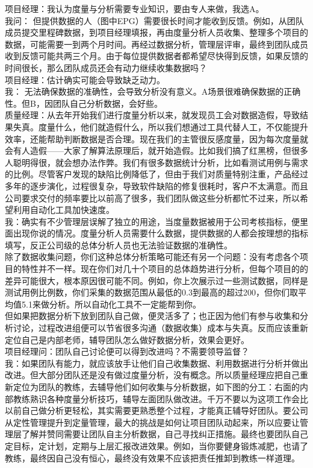 项目经理：我认为度量与分析需要专业知识，要由专人来做，我选A。\\
我问：
但提供数据的人（图中EPG）需要很长时间才能收到反馈。例如，从团队成员提交里程碑数据，到项目经理填报，再由度量分析人员收集、整理多个项目的数据，可能需要一到两个月时间。再经过数据分析，管理层评审，最终到团队成员收到反馈可能共两三个月。由于每位提供数据者都希望尽快得到反馈，如果反馈的时间很长，那么团队成员还会有动力继续收集数据吗？\\
项目经理：估计确实可能会导致缺乏动力。\\
我：
无法确保数据的准确性，会导致分析没有意义。A场景很难确保数据的正确性。但B，因团队自己分析数据，会好些。\\
质量经理：从去年开始我们进行度量分析以来，就发现员工会对数据造假，导致结果失真。度量什么，他们就造假什么，所以我们想通过工具代替人工，不仅能提升效率，还能帮助判断数据是否合理。现在我们的主管很反感度量，因为每次度量就会有人造假------大家了解算法原理后，就开始造假。比如我们搞了红黑榜，但很多人聪明得很，就会想办法作弊。我们有很多数据统计分析，比如看测试用例与需求的比例。尽管客户发现的缺陷比例降低了，但由于我们对质量特别注重，产品经过多年的逐步演化，过程很复杂，导致软件缺陷的修复很耗时，客户不太满意。而且公司要求交付的频率要比以前高了很多，我们团队做这些分析都忙不过来，所以希望利用自动化工具加快速度。\\
我：确实有不少管理层误解了独立的用途，当度量数据被用于公司考核指标，便里面出现你说的情况。度量分析人员需要什么数据，提供数据的人都会按理想的指标填写，反正公司级的总体分析人员也无法验证数据的准确性。\\
除了数据收集问题，你们这种总体分析策略可能还有另一个问题：没有考虑各个项目的特性并不一样。现在你们对几十个项目的总体趋势进行分析，但每个项目的的差异可能很大，根本原因很可能不同。例如，你上次展示过一些测试数据，同样是测试用例比例数，你们采集的数据范围从最低的0.3到最高的超过200，但你们取平均值5.1来做分析。所以自动化工具不一定能帮到你。\\
但如果把数据分析下放到团队自己做，便灵活多了；也正因为他们有参与收集和分析讨论，过程改进组便可以节省很多沟通（数据收集）成本与失真。反而应该重新定位自己是内部老师，辅导团队怎么做好数据分析，效果会更好。\\
项目经理问：团队自己讨论便可以得到改进吗？不需要领导监督？\\
我：如果团队有能力，就应该放手让他们自己收集数据、利用数据进行分析并做出改进。但大部分团队还是没有做过度量分析，没有概念。所以质量经理应把自己重新定位为团队的教练，去辅导他们如何收集与分析数据，如下图的分工：右面的内部教练熟识各种度量分析技巧，辅导左面团队做改进。千万不要以为这项工作会比以前自己做分析更轻松，其实需要更熟悉整个过程，才能真正辅导好团队。要公司从定性管理提升到定量管理，最大的挑战是如何让项目团队动起来，所以应要让管理层了解并赞同需要让团队自主分析数据，自己寻找纠正措施。最终也要团队自己定目标，定计划，定期与上层汇报改进效果。例如，当你要健身锻炼减肥，也请了教练，最终因自己没有恒心，最终没有效果不应该把责任推卸到教练一样道理。\\

